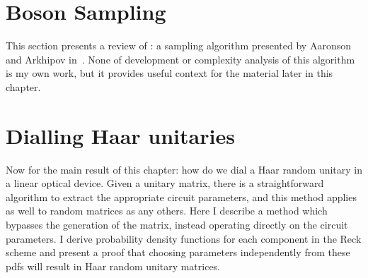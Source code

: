 \section{Boson Sampling}
\label{sec:BosenSampling}
This section presents a review of \bosonsampling{}: a sampling algorithm
presented by Aaronson and Arkhipov in~\cite{bosonsampling}. None of development
or complexity analysis of this algorithm is my own work, but it provides useful
context for the material later in this chapter.

\section{Dialling Haar unitaries}
\label{sec:Parameterization}
Now for the main result of this chapter: how do we dial a Haar random unitary in
a linear optical device. Given a unitary matrix, there is a straightforward
algorithm  to extract the appropriate circuit
parameters, and this method applies as well to random matrices as any others.
Here I describe a method which bypasses the generation of the matrix, instead
operating directly on the circuit parameters. I derive probability density
functions for each component in the Reck scheme and present a proof that
choosing parameters independently from these pdfs will result in Haar random
unitary matrices.

